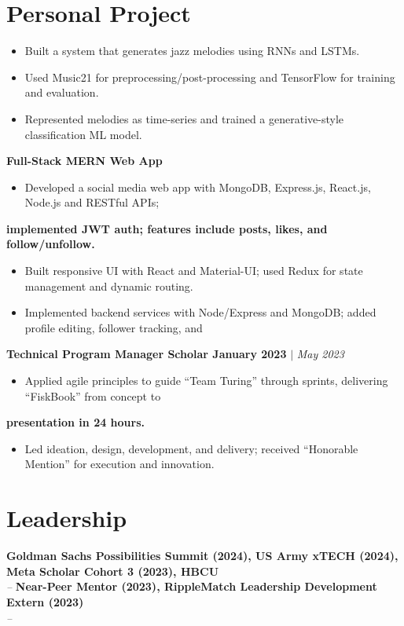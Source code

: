 \documentclass[letterpaper,11pt]{article}
\begin{document}
\section{Personal Project}
\textbf{}
\begin{itemize}
  \item Built a system that generates jazz melodies using RNNs and LSTMs.
  \item Used Music21 for preprocessing/post-processing and TensorFlow for training and evaluation.
  \item Represented melodies as time-series and trained a generative-style classification ML model.
\end{itemize}
\textbf{Full-Stack MERN Web App}
\begin{itemize}
  \item Developed a social media web app with MongoDB, Express.js, React.js, Node.js and RESTful APIs;
\end{itemize}
\textbf{implemented JWT auth; features include posts, likes, and follow/unfollow.}
\begin{itemize}
  \item Built responsive UI with React and Material-UI; used Redux for state management and dynamic routing.
  \item Implemented backend services with Node/Express and MongoDB; added profile editing, follower tracking, and
\end{itemize}
\textbf{Technical Program Manager Scholar January 2023}
 $|$ \textit{May 2023}\begin{itemize}
  \item Applied agile principles to guide “Team Turing” through sprints, delivering “FiskBook” from concept to
\end{itemize}
\textbf{presentation in 24 hours.}
\begin{itemize}
  \item Led ideation, design, development, and delivery; received “Honorable Mention” for execution and innovation.
\end{itemize}




\section{Leadership}
\textbf{Goldman Sachs Possibilities Summit (2024), US Army xTECH (2024), Meta Scholar Cohort 3 (2023), HBCU} \hfill  \\
\textit{} \hfill \textit{ -- }
\vspace{2pt}\textbf{Near-Peer Mentor (2023), RippleMatch Leadership Development Extern (2023)} \hfill  \\
\textit{} \hfill \textit{ -- }
\vspace{2pt}
\end{document}
